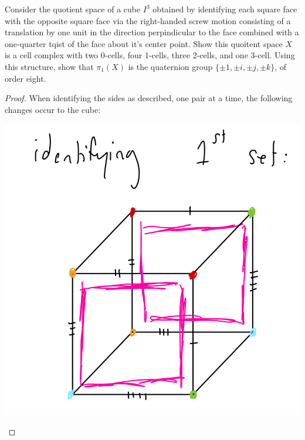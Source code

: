 \documentclass[12pt]{article}
\newenvironment{statement}[2][Statement]{\begin{trivlist}
\item[\hskip \labelsep {\bfseries #1}\hskip \labelsep {\bfseries #2.}]}{\end{trivlist}}
\begin{document}
\begin{statement}[Problem]{2}
  Consider the quotient space of a cube $I^3$ obtained by identifying each square face with the opposite
  square face via the right-handed screw motion consisting of a translation by one unit in the direction 
  perpindicular to the face combined with a one-quarter tqist of the face about it's center point. Show 
  this quoitent space $X$ is a cell complex with two 0-cells, four 1-cells, three 2-cells, and one 3-cell. 
  Using this structure, show that $\pi_1(X)$ is the quaternion group $\{ \pm 1, \pm i, \pm j, \pm k \}$, 
  of order eight. 
\end{statement}
\begin{proof}
  When identifying the sides as described, one pair at a time, the following changes occur to the cube:
  \par \begin{center} \includegraphics[scale=.2]{2-1.png} \end{center} 

\end{proof}
\end{document}
